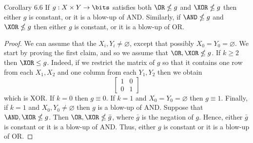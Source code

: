\begin{originalresult}{Corollary 6.6}
If $g:X\times Y\to\bits$ satisfies both $\OR\nleq g$ and $\XOR\nleq g$ then either $g$ is constant, or it is a blow-up of AND. Similarly, if $\AND\nleq g$ and $\XOR\nleq g$ then either $g$ is constant, or it is a blow-up of OR.
\end{originalresult}
\begin{proof}
We can assume that the $X_i,Y_i\ne\varnothing$, except that possibly $X_0=Y_0=\varnothing$. We start by proving the first claim, and so we assume that $\OR,\XOR\nleq g$.
If $k\ge2$ then $\XOR\le g$. Indeed, if we restrict the matrix of $g$ so that it contains one row from each $X_1,X_2$ and one column from each $Y_1,Y_2$ then we obtain
\[\begin{bmatrix}1&0\\0&1\end{bmatrix}\]
which is XOR. If $k=0$ then $g\equiv0$. If $k=1$ and $X_0=Y_0=\varnothing$ then $g\equiv1$. Finally, if $k=1$ and $X_0,Y_0\ne\varnothing$ then $g$ is a blow-up of AND.
Suppose that $\AND,\XOR\nleq g$. Then $\OR,\XOR\nleq\bar g$, where $\bar g$ is the negation of $g$. Hence, either $\bar g$ is constant or it is a blow-up of AND. Thus, either $g$ is constant or it is a blow-up of OR.
\end{proof}
